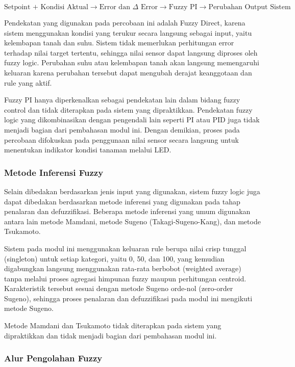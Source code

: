 \documentclass[12pt,a4paper]{article}
\begin{document}
\[
\text{Setpoint + Kondisi Aktual}
\rightarrow
\text{Error dan } \Delta\text{ Error}
\rightarrow
\text{Fuzzy PI}
\rightarrow
\text{Perubahan Output Sistem}
\]

Pendekatan yang digunakan pada percobaan ini adalah Fuzzy Direct, karena sistem menggunakan kondisi yang terukur secara langsung sebagai input, yaitu kelembapan tanah dan suhu. Sistem tidak memerlukan perhitungan error terhadap nilai target tertentu, sehingga nilai sensor dapat langsung diproses oleh fuzzy logic. Perubahan suhu atau kelembapan tanah akan langsung memengaruhi keluaran karena perubahan tersebut dapat mengubah derajat keanggotaan dan rule yang aktif.

Fuzzy PI hanya diperkenalkan sebagai pendekatan lain dalam bidang fuzzy control dan tidak diterapkan pada sistem yang dipraktikkan. Pendekatan fuzzy logic yang dikombinasikan dengan pengendali lain seperti PI atau PID juga tidak menjadi bagian dari pembahasan modul ini. Dengan demikian, proses pada percobaan difokuskan pada penggunaan nilai sensor secara langsung untuk menentukan indikator kondisi tanaman melalui LED.

\subsubsection{Metode Inferensi Fuzzy}

Selain dibedakan berdasarkan jenis input yang digunakan, sistem fuzzy logic juga dapat dibedakan berdasarkan metode inferensi yang digunakan pada tahap penalaran dan defuzzifikasi. Beberapa metode inferensi yang umum digunakan antara lain metode Mamdani, metode Sugeno (Takagi-Sugeno-Kang), dan metode Tsukamoto.

Sistem pada modul ini menggunakan keluaran rule berupa nilai crisp tunggal (singleton) untuk setiap kategori, yaitu 0, 50, dan 100, yang kemudian digabungkan langsung menggunakan rata-rata berbobot (weighted average) tanpa melalui proses agregasi himpunan fuzzy maupun perhitungan centroid. Karakteristik tersebut sesuai dengan metode Sugeno orde-nol (zero-order Sugeno), sehingga proses penalaran dan defuzzifikasi pada modul ini mengikuti metode Sugeno.

Metode Mamdani dan Tsukamoto tidak diterapkan pada sistem yang dipraktikkan dan tidak menjadi bagian dari pembahasan modul ini.

\subsubsection{Alur Pengolahan Fuzzy}
\end{document}
